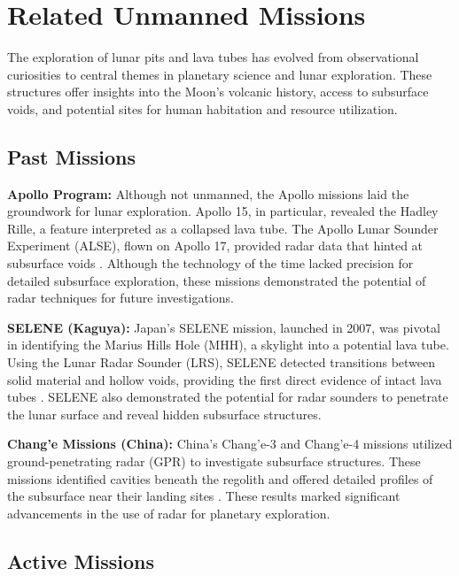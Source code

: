 \graphicspath{{img/ch5}}
\section{Related Unmanned Missions}

The exploration of lunar pits and lava tubes has evolved from observational curiosities to central themes in planetary science and lunar exploration. These structures offer insights into the Moon’s volcanic history, access to subsurface voids, and potential sites for human habitation and resource utilization.

\subsection{Past Missions}

\textbf{Apollo Program:} 
Although not unmanned, the Apollo missions laid the groundwork for lunar exploration. Apollo 15, in particular, revealed the Hadley Rille, a feature interpreted as a collapsed lava tube. The Apollo Lunar Sounder Experiment (ALSE), flown on Apollo 17, provided radar data that hinted at subsurface voids \cite{radar-observations-lava-tubes}. Although the technology of the time lacked precision for detailed subsurface exploration, these missions demonstrated the potential of radar techniques for future investigations.

\textbf{SELENE (Kaguya):} 
Japan's SELENE mission, launched in 2007, was pivotal in identifying the Marius Hills Hole (MHH), a skylight into a potential lava tube. Using the Lunar Radar Sounder (LRS), SELENE detected transitions between solid material and hollow voids, providing the first direct evidence of intact lava tubes \cite{cavities-selene-lavatubes}. SELENE also demonstrated the potential for radar sounders to penetrate the lunar surface and reveal hidden subsurface structures.


\cite{lro}

\textbf{Chang’e Missions (China):} 
China’s Chang’e-3 and Chang’e-4 missions utilized ground-penetrating radar (GPR) to investigate subsurface structures. These missions identified cavities beneath the regolith and offered detailed profiles of the subsurface near their landing sites \cite{radar-observations-lava-tubes}. These results marked significant advancements in the use of radar for planetary exploration.

\subsection{Active Missions}

